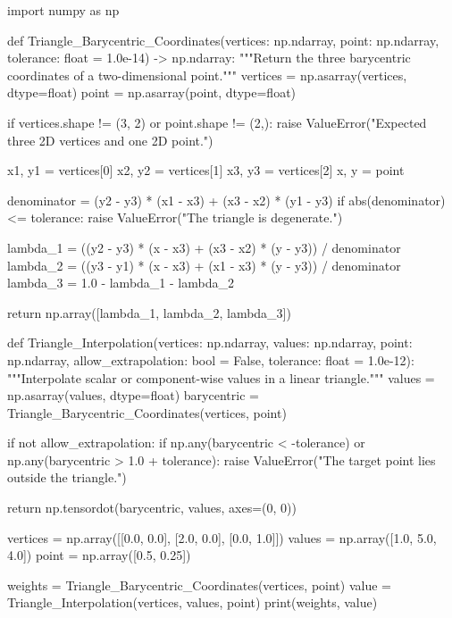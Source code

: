 \begin{python}
import numpy as np


def Triangle_Barycentric_Coordinates(vertices: np.ndarray,
                                     point: np.ndarray,
                                     tolerance: float = 1.0e-14) -> np.ndarray:
    """Return the three barycentric coordinates of a two-dimensional point."""
    vertices = np.asarray(vertices, dtype=float)
    point = np.asarray(point, dtype=float)

    if vertices.shape != (3, 2) or point.shape != (2,):
        raise ValueError("Expected three 2D vertices and one 2D point.")

    x1, y1 = vertices[0]
    x2, y2 = vertices[1]
    x3, y3 = vertices[2]
    x, y = point

    denominator = (y2 - y3) * (x1 - x3) + (x3 - x2) * (y1 - y3)
    if abs(denominator) <= tolerance:
        raise ValueError("The triangle is degenerate.")

    lambda_1 = ((y2 - y3) * (x - x3)
                + (x3 - x2) * (y - y3)) / denominator
    lambda_2 = ((y3 - y1) * (x - x3)
                + (x1 - x3) * (y - y3)) / denominator
    lambda_3 = 1.0 - lambda_1 - lambda_2

    return np.array([lambda_1, lambda_2, lambda_3])


def Triangle_Interpolation(vertices: np.ndarray,
                           values: np.ndarray,
                           point: np.ndarray,
                           allow_extrapolation: bool = False,
                           tolerance: float = 1.0e-12):
    """Interpolate scalar or component-wise values in a linear triangle."""
    values = np.asarray(values, dtype=float)
    barycentric = Triangle_Barycentric_Coordinates(vertices, point)

    if not allow_extrapolation:
        if np.any(barycentric < -tolerance) or np.any(barycentric > 1.0 + tolerance):
            raise ValueError("The target point lies outside the triangle.")

    return np.tensordot(barycentric, values, axes=(0, 0))


vertices = np.array([[0.0, 0.0],
                     [2.0, 0.0],
                     [0.0, 1.0]])
values = np.array([1.0, 5.0, 4.0])
point = np.array([0.5, 0.25])

weights = Triangle_Barycentric_Coordinates(vertices, point)
value = Triangle_Interpolation(vertices, values, point)
print(weights, value)
\end{python}

